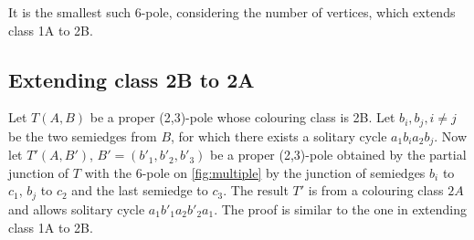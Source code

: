 %		
%		

It is the smallest such 6-pole, considering the number of vertices, which extends class 1A to 2B.

\subsection{Extending class 2B to 2A}

Let $T(A,B)$ be a proper (2,3)-pole whose colouring class is 2B. Let $b_i,b_j,i\neq j$ be the two semiedges from $B$, for which there exists a solitary cycle $a_1b_ia_2b_j$. Now let $T'(A,B')$, $B'=(b'_1, b'_2, b'_3)$ be a proper (2,3)-pole obtained by the partial junction of $T$ with the 6-pole on \cref{fig:multiple} by the junction of semiedges $b_i$ to $c_1$, $b_j$ to $c_2$ and the last semiedge to $c_3$. The result $T'$ is from a colouring class $2A$ and allows solitary cycle $a_1b'_1a_2b'_2a_1$. The proof is similar to the one in extending class 1A to 2B.

%	

